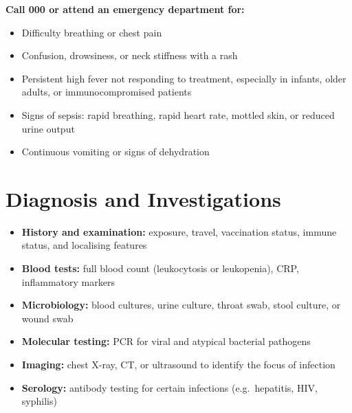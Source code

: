 \textbf{Call 000 or attend an emergency department for:}
\begin{itemize}
    \item Difficulty breathing or chest pain
    \item Confusion, drowsiness, or neck stiffness with a rash
    \item Persistent high fever not responding to treatment, especially in infants, older adults, or immunocompromised patients
    \item Signs of sepsis: rapid breathing, rapid heart rate, mottled skin, or reduced urine output
    \item Continuous vomiting or signs of dehydration
\end{itemize}

\section*{Diagnosis and Investigations}
\begin{itemize}
    \item \textbf{History and examination:} exposure, travel, vaccination status, immune status, and localising features
    \item \textbf{Blood tests:} full blood count (leukocytosis or leukopenia), CRP, inflammatory markers
    \item \textbf{Microbiology:} blood cultures, urine culture, throat swab, stool culture, or wound swab
    \item \textbf{Molecular testing:} PCR for viral and atypical bacterial pathogens
    \item \textbf{Imaging:} chest X-ray, CT, or ultrasound to identify the focus of infection
    \item \textbf{Serology:} antibody testing for certain infections (e.g.\ hepatitis, HIV, syphilis)
\end{itemize}

